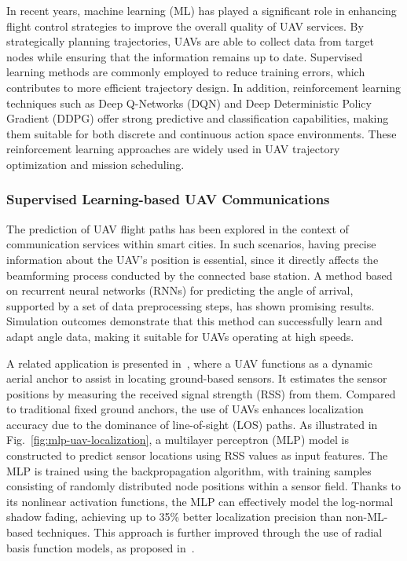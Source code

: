 In recent years, machine learning (ML) has played a significant role in enhancing flight control strategies to improve the overall quality of UAV services. By strategically planning trajectories, UAVs are able to collect data from target nodes while ensuring that the information remains up to date. Supervised learning methods are commonly employed to reduce training errors, which contributes to more efficient trajectory design. In addition, reinforcement learning techniques such as Deep Q-Networks (DQN) and Deep Deterministic Policy Gradient (DDPG) offer strong predictive and classification capabilities, making them suitable for both discrete and continuous action space environments. These reinforcement learning approaches are widely used in UAV trajectory optimization and mission scheduling.




\subsubsection{Supervised Learning-based UAV Communications}



The prediction of UAV flight paths has been explored in the context of communication services within smart cities. In such scenarios, having precise information about the UAV’s position is essential, since it directly affects the beamforming process conducted by the connected base station. A method based on recurrent neural networks (RNNs) for predicting the angle of arrival, supported by a set of data preprocessing steps, has shown promising results. Simulation outcomes demonstrate that this method can successfully learn and adapt angle data, making it suitable for UAVs operating at high speeds.

A related application is presented in~\cite{annepu2020uav}, where a UAV functions as a dynamic aerial anchor to assist in locating ground-based sensors. It estimates the sensor positions by measuring the received signal strength (RSS) from them. Compared to traditional fixed ground anchors, the use of UAVs enhances localization accuracy due to the dominance of line-of-sight (LOS) paths. As illustrated in Fig.~\ref{fig:mlp-uav-localization}, a multilayer perceptron (MLP) model is constructed to predict sensor locations using RSS values as input features. The MLP is trained using the backpropagation algorithm, with training samples consisting of randomly distributed node positions within a sensor field. Thanks to its nonlinear activation functions, the MLP can effectively model the log-normal shadow fading, achieving up to 35\% better localization precision than non-ML-based techniques. This approach is further improved through the use of radial basis function models, as proposed in~\cite{annepu2021radial}.




